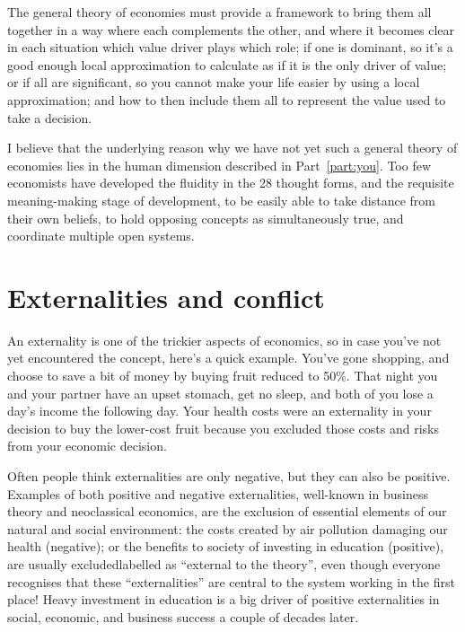 The general theory of economies must provide a framework to bring them all together in a way where each complements the other, and where it becomes clear in each situation which value driver plays which role; if one is dominant, so it's a good enough local approximation to calculate as if it is the only driver of value; or if all are significant, so you cannot make your life easier by using a local approximation; and how to then include them all to represent the value used to take a decision.


I believe that the underlying reason why we have not yet such a general theory of economies lies in the human dimension described in Part~\ref{part:you}. Too few economists have developed the fluidity in the 28 thought forms,  and the requisite meaning-making stage of development, to be easily able to take distance from their own beliefs, to hold opposing concepts as simultaneously true, and coordinate multiple open systems. 




\section{Externalities and conflict}
An externality is one of the trickier aspects of economics,   so in case you’ve not yet encountered the concept, here’s a quick example. You’ve gone shopping, and choose to save a bit of money by buying fruit reduced to 50\%. That night you and your partner have an upset stomach, get no sleep, and both of you lose a day’s income the following day. Your health costs were an externality in your decision to buy the lower-cost fruit because you excluded those costs and risks from your economic decision. 


Often people think externalities are only negative, but they can also be positive.  Examples of both positive and negative externalities, well-known in business theory and neoclassical economics,  are the exclusion of essential elements of our natural and social environment: the costs created by air pollution damaging our health (negative); or the benefits to society of investing in education (positive), are usually excluded\textemdash labelled as “external to the theory”, even though everyone recognises that these “externalities” are central to the system working in the first place! Heavy investment in education is a big driver of positive externalities in social, economic, and business success a couple of decades later.


